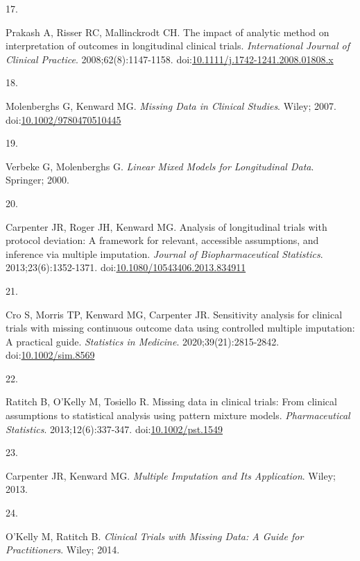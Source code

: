 \documentclass[
  11pt,
]{article}
\newlength{\cslhangindent}
\newlength{\csllabelwidth}
\newenvironment{CSLReferences}[2] %
 {\begin{list}{}{%
  \setlength{\itemindent}{0pt}
  \setlength{\leftmargin}{0pt}
  \setlength{\parsep}{0pt}
  \ifodd #1
   \setlength{\leftmargin}{\cslhangindent}
   \setlength{\itemindent}{-1\cslhangindent}
  \fi
  \setlength{\itemsep}{#2\baselineskip}}}
 {\end{list}}
\newcommand{\CSLLeftMargin}[1]{\parbox[t]{\csllabelwidth}{\strut#1\strut}}
\newcommand{\CSLRightInline}[1]{\parbox[t]{\linewidth - \csllabelwidth}{\strut#1\strut}}
\begin{document}
\begin{CSLReferences}{0}{1}
\CSLLeftMargin{17. }%
\CSLRightInline{Prakash A, Risser RC, Mallinckrodt CH. The impact of analytic method on interpretation of outcomes in longitudinal clinical trials. \emph{International Journal of Clinical Practice}. 2008;62(8):1147-1158. doi:\href{https://doi.org/10.1111/j.1742-1241.2008.01808.x}{10.1111/j.1742-1241.2008.01808.x}}

\CSLLeftMargin{18. }%
\CSLRightInline{Molenberghs G, Kenward MG. \emph{Missing Data in Clinical Studies}. Wiley; 2007. doi:\href{https://doi.org/10.1002/9780470510445}{10.1002/9780470510445}}

\CSLLeftMargin{19. }%
\CSLRightInline{Verbeke G, Molenberghs G. \emph{Linear Mixed Models for Longitudinal Data}. Springer; 2000.}

\CSLLeftMargin{20. }%
\CSLRightInline{Carpenter JR, Roger JH, Kenward MG. Analysis of longitudinal trials with protocol deviation: A framework for relevant, accessible assumptions, and inference via multiple imputation. \emph{Journal of Biopharmaceutical Statistics}. 2013;23(6):1352-1371. doi:\href{https://doi.org/10.1080/10543406.2013.834911}{10.1080/10543406.2013.834911}}

\CSLLeftMargin{21. }%
\CSLRightInline{Cro S, Morris TP, Kenward MG, Carpenter JR. Sensitivity analysis for clinical trials with missing continuous outcome data using controlled multiple imputation: A practical guide. \emph{Statistics in Medicine}. 2020;39(21):2815-2842. doi:\href{https://doi.org/10.1002/sim.8569}{10.1002/sim.8569}}

\CSLLeftMargin{22. }%
\CSLRightInline{Ratitch B, O'Kelly M, Tosiello R. Missing data in clinical trials: From clinical assumptions to statistical analysis using pattern mixture models. \emph{Pharmaceutical Statistics}. 2013;12(6):337-347. doi:\href{https://doi.org/10.1002/pst.1549}{10.1002/pst.1549}}

\CSLLeftMargin{23. }%
\CSLRightInline{Carpenter JR, Kenward MG. \emph{Multiple Imputation and Its Application}. Wiley; 2013.}

\CSLLeftMargin{24. }%
\CSLRightInline{O'Kelly M, Ratitch B. \emph{Clinical Trials with Missing Data: A Guide for Practitioners}. Wiley; 2014.}


\end{CSLReferences}
\end{document}
